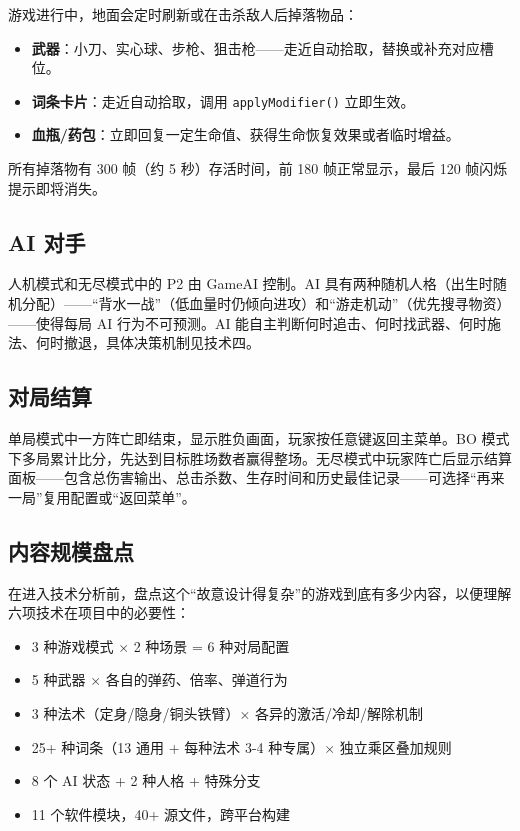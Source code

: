 \documentclass[utf8]{ctexart}
\begin{document}
游戏进行中，地面会定时刷新或在击杀敌人后掉落物品：

\begin{itemize}
  \item \textbf{武器}：小刀、实心球、步枪、狙击枪——走近自动拾取，替换或补充对应槽位。
  \item \textbf{词条卡片}：走近自动拾取，调用 \texttt{applyModifier()} 立即生效。
  \item \textbf{血瓶/药包}：立即回复一定生命值、获得生命恢复效果或者临时增益。
\end{itemize}

所有掉落物有 300 帧（约 5 秒）存活时间，前 180 帧正常显示，最后 120 帧闪烁提示即将消失。

\subsection{AI 对手}

人机模式和无尽模式中的 P2 由 GameAI 控制。AI 具有两种随机人格（出生时随机分配）——“背水一战”（低血量时仍倾向进攻）和“游走机动”（优先搜寻物资）——使得每局 AI 行为不可预测。AI 能自主判断何时追击、何时找武器、何时施法、何时撤退，具体决策机制见技术四。

\subsection{对局结算}

单局模式中一方阵亡即结束，显示胜负画面，玩家按任意键返回主菜单。BO 模式下多局累计比分，先达到目标胜场数者赢得整场。无尽模式中玩家阵亡后显示结算面板——包含总伤害输出、总击杀数、生存时间和历史最佳记录——可选择“再来一局”复用配置或“返回菜单”。

\subsection{内容规模盘点}

在进入技术分析前，盘点这个“故意设计得复杂”的游戏到底有多少内容，以便理解六项技术在项目中的必要性：

\begin{itemize}
  \item 3 种游戏模式 $\times$ 2 种场景 = 6 种对局配置
  \item 5 种武器 $\times$ 各自的弹药、倍率、弹道行为
  \item 3 种法术（定身/隐身/铜头铁臂）$\times$ 各异的激活/冷却/解除机制
  \item 25+ 种词条（13 通用 + 每种法术 3-4 种专属）$\times$ 独立乘区叠加规则
  \item 8 个 AI 状态 + 2 种人格 + 特殊分支
  \item 11 个软件模块，40+ 源文件，跨平台构建
\end{itemize}
\end{document}

